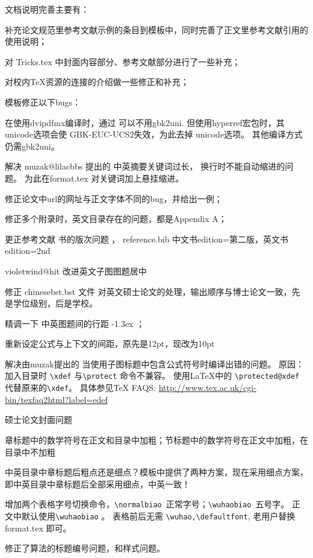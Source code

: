 文档说明完善主要有：
\begin{hitlist}
  \item 补充论文规范里参考文献示例的条目到模板中，同时完善了正文里参考文献引用的使用说明；
  \item 对 Tricks.tex 中封面内容部分、参考文献部分进行了一些补充；
  \item 对校内TeX资源的连接的介绍做一些修正和补充；
\end{hitlist}


模板修正以下bugs：
\begin{hitlist}
    \item 在使用dvipdfmx编译时，通过  可以不用gbk2uni.
        但使用hyperref宏包时，其unicode选项会使 GBK-EUC-UCS2失效，为此去掉
        unicode选项。 其他编译方式 仍需gbk2uni。
    \item 解决 muzak@lilacbbs 提出的 中英摘要关键词过长，
换行时不能自动缩进的问题。 为此在format.tex 对关键词加上悬挂缩进。
    \item 修正论文中url的网址与正文字体不同的bug，并给出一例；
    \item 修正多个附录时，英文目录存在的问题，都是Appendix A；
    \item 更正参考文献 书的版次问题 ， reference.bib 中文书edition={第二版}，英文书 edition={2nd}
    \item violetwind@hit  改进英文子图图题居中
    \item 修正 chinesebst.bst 文件 对英文硕士论文的处理，输出顺序与博士论文一致，先是学位级别，后是学校。
    \item 精调一下 中英图题间的行距 -1.3ex ；
    \item 重新设定公式与上下文的间距，原先是12pt，现改为10pt
    \item 解决由muzak提出的 当使用子图标题中包含公式符号时编译出错的问题。
原因：加入目录时 \verb|\xdef| 与\verb|\protect| 命令不兼容。 使用LaTeX中的 \verb|\protected@xdef|  代替原来的\verb|\xdef|。
具体参见TeX FAQS: \url{http://www.tex.ac.uk/cgi-bin/texfaq2html?label=edef}
	\item 硕士论文封面问题
	\item 章标题中的数学符号在正文和目录中加粗；节标题中的数学符号在正文中加粗，在目录中不加粗
	\item 中英目录中章标题后粗点还是细点？模板中提供了两种方案，现在采用细点方案，即中英目录中章标题后全部采用细点，中英一致！
	\item 增加两个表格字号切换命令，\verb+\normalbiao+~正常字号；\verb+\wuhaobiao+~五号字。 正文中默认使用\verb+\wuhaobiao+ 。
表格前后无需 \verb+\wuhao,\defaultfont+, 老用户替换 format.tex 即可。
  \item 修正了算法的标题编号问题，和样式问题。
\end{hitlist}


